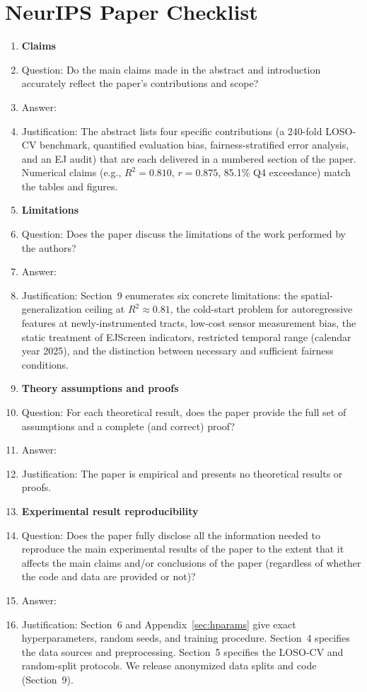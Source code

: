 \section*{NeurIPS Paper Checklist}

\begin{enumerate}

\item {\bf Claims}
    \item[] Question: Do the main claims made in the abstract and introduction accurately reflect the paper's contributions and scope?
    \item[] Answer: \answerYes{}
    \item[] Justification: The abstract lists four specific contributions (a 240-fold LOSO-CV benchmark, quantified evaluation bias, fairness-stratified error analysis, and an EJ audit) that are each delivered in a numbered section of the paper. Numerical claims (e.g., $R^2=0.810$, $r=0.875$, 85.1\% Q4 exceedance) match the tables and figures.

\item {\bf Limitations}
    \item[] Question: Does the paper discuss the limitations of the work performed by the authors?
    \item[] Answer: \answerYes{}
    \item[] Justification: Section~9 enumerates six concrete limitations: the spatial-generalization ceiling at $R^2\approx 0.81$, the cold-start problem for autoregressive features at newly-instrumented tracts, low-cost sensor measurement bias, the static treatment of EJScreen indicators, restricted temporal range (calendar year 2025), and the distinction between necessary and sufficient fairness conditions.

\item {\bf Theory assumptions and proofs}
    \item[] Question: For each theoretical result, does the paper provide the full set of assumptions and a complete (and correct) proof?
    \item[] Answer: \answerNA{}
    \item[] Justification: The paper is empirical and presents no theoretical results or proofs.

\item {\bf Experimental result reproducibility}
    \item[] Question: Does the paper fully disclose all the information needed to reproduce the main experimental results of the paper to the extent that it affects the main claims and/or conclusions of the paper (regardless of whether the code and data are provided or not)?
    \item[] Answer: \answerYes{}
    \item[] Justification: Section~6 and Appendix~\ref{sec:hparams} give exact hyperparameters, random seeds, and training procedure. Section~4 specifies the data sources and preprocessing. Section~5 specifies the LOSO-CV and random-split protocols. We release anonymized data splits and code (Section~9).


\end{enumerate}
